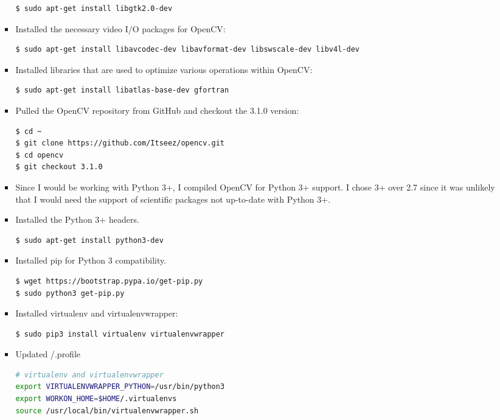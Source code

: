 \documentclass[journal, a4paper]{IEEEtran}
\begin{document}
\begin{itemize}
\begin{itemize}
\begin{itemize}
\begin{lstlisting}[language=bash]
$ sudo apt-get install libgtk2.0-dev
			\end{lstlisting}
            \item Installed the necessary video I/O packages for OpenCV:
            \begin{lstlisting}[language=bash]
$ sudo apt-get install libavcodec-dev libavformat-dev libswscale-dev libv4l-dev
			\end{lstlisting}
            \item Installed libraries that are used to optimize various operations within OpenCV:
            \begin{lstlisting}[language=bash]
$ sudo apt-get install libatlas-base-dev gfortran
			\end{lstlisting}
            \item Pulled the OpenCV repository from GitHub and checkout the 3.1.0  version:
            \begin{lstlisting}[language=bash]
$ cd ~
$ git clone https://github.com/Itseez/opencv.git
$ cd opencv
$ git checkout 3.1.0
			\end{lstlisting}
            \item Since I would be working with Python 3+, I compiled OpenCV for Python 3+ support. I chose 3+ over 2.7 since it was unlikely that I would need the support of scientific packages not up-to-date with Python 3+. 
            \item Installed the Python 3+ headers.
            \begin{lstlisting}[language=bash]
$ sudo apt-get install python3-dev
			\end{lstlisting}
            \item Installed pip for Python 3 compatibility.
            \begin{lstlisting}[language=bash]
$ wget https://bootstrap.pypa.io/get-pip.py
$ sudo python3 get-pip.py
			\end{lstlisting}
            \item Installed virtualenv and virtualenvwrapper:
            \begin{lstlisting}[language=bash]
$ sudo pip3 install virtualenv virtualenvwrapper
			\end{lstlisting}
            \item Updated \texttildelow /.profile
            \begin{lstlisting}[language=bash]
# virtualenv and virtualenvwrapper
export VIRTUALENVWRAPPER_PYTHON=/usr/bin/python3
export WORKON_HOME=$HOME/.virtualenvs
source /usr/local/bin/virtualenvwrapper.sh

\end{lstlisting}
\end{itemize}
\end{itemize}
\end{itemize}
\end{document}
